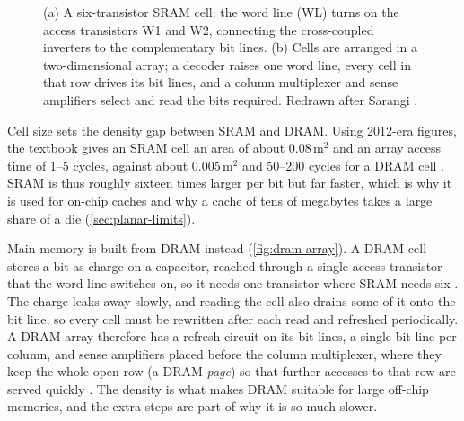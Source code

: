 \begin{figure}[htbp]
\caption[SRAM cell and array]{(a) A six-transistor SRAM cell: the word line (WL) turns on the access transistors W1 and W2, connecting the cross-coupled inverters to the complementary bit lines. (b) Cells are arranged in a two-dimensional array; a decoder raises one word line, every cell in that row drives its bit lines, and a column multiplexer and sense amplifiers select and read the bits required. Redrawn after Sarangi \cite[sec.~7.4.1, Figs.~7.26--7.27]{sarangi2025basic}.}
\label{fig:sram-array}
\end{figure}


Cell size sets the density gap between SRAM and DRAM. Using 2012-era figures, the textbook gives an SRAM cell an area of about 0.08\,\textmu m$^2$ and an array access time of 1--5 cycles, against about 0.005\,\textmu m$^2$ and 50--200 cycles for a DRAM cell \cite[sec.~11.1.1, Table~11.1]{sarangi2025basic}. SRAM is thus roughly sixteen times larger per bit but far faster, which is why it is used for on-chip caches and why a cache of tens of megabytes takes a large share of a die (\cref{sec:planar-limits}).

Main memory is built from DRAM instead (\cref{fig:dram-array}). A DRAM cell stores a bit as charge on a capacitor, reached through a single access transistor that the word line switches on, so it needs one transistor where SRAM needs six \cite[sec.~7.4.3]{sarangi2025basic}. The charge leaks away slowly, and reading the cell also drains some of it onto the bit line, so every cell must be rewritten after each read and refreshed periodically. A DRAM array therefore has a refresh circuit on its bit lines, a single bit line per column, and sense amplifiers placed before the column multiplexer, where they keep the whole open row (a DRAM \emph{page}) so that further accesses to that row are served quickly \cite[sec.~7.4.3]{sarangi2025basic}. The density is what makes DRAM suitable for large off-chip memories, and the extra steps are part of why it is so much slower.

